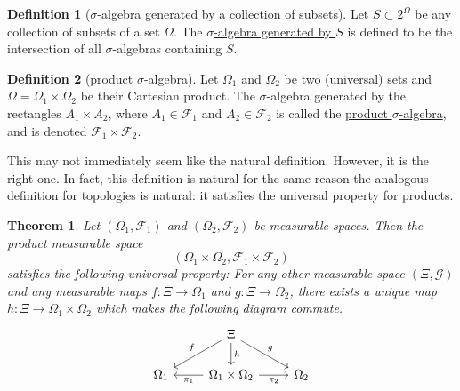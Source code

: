 \documentclass[a4paper,12pt]{scrreprt}
\newcommand{\defn}[1]{\ul{#1}}
\theoremstyle{definition}
\newtheorem{definition}{Definition}[section]
\theoremstyle{plain}
\newtheorem{theorem}{Theorem}[section]
\theoremstyle{remark}
\begin{document}
\begin{definition}[$\sigma$-algebra generated by a collection of subsets]
  \label{def:generatedsigmaalgebra}
  Let $S \subset 2^{\Omega}$ be any collection of subsets of a set $\Omega$. The \defn{$\sigma$-algebra generated by $S$} is defined to be the intersection of all $\sigma$-algebras containing $S$.
\end{definition}

\begin{definition}[product $\sigma$-algebra]
  \label{def:productsigmaalgebra}
  Let $\Omega_{1}$ and $\Omega_{2}$ be two (universal) sets and $\Omega = \Omega_{1} \times \Omega_{2}$ be their Cartesian product. The $\sigma$-algebra generated by the rectangles $A_{1} \times A_{2}$, where $A_{1} \in \mathcal{F}_{1}$ and $A_{2} \in \mathcal{F}_{2}$ is called the \defn{product $\sigma$-algebra}, and is denoted $\mathcal{F}_{1} \times \mathcal{F}_{2}$.
\end{definition}

This may not immediately seem like the natural definition. However, it is the right one. In fact, this definition is natural for the same reason the analogous definition for topologies is natural: it satisfies the universal property for products.

\begin{theorem}
  \label{thm:universalpropertyforproductofmeasurablespaces}
  Let $(\Omega_{1}, \mathcal{F}_{1})$ and $(\Omega_{2}, \mathcal{F}_{2})$ be measurable spaces. Then the product measurable space
  \begin{equation*}
    (\Omega_{1} \times \Omega_{2}, \mathcal{F}_{1} \times \mathcal{F}_{2})
  \end{equation*}
  satisfies the following universal property: For any other measurable space $(\Xi, \mathcal{G})$ and any measurable maps $f\colon \Xi \to \Omega_{1}$ and $g\colon \Xi \to \Omega_{2}$, there exists a unique map $h\colon \Xi \to \Omega_{1} \times \Omega_{2}$ which makes the following diagram commute.
  \begin{equation*}
    \begin{tikzcd}
      & \Xi
      \arrow[dr, "g"]
      \arrow[dl, swap, "f"]
      \arrow[d, "h"]
      \\
      \Omega_{1}
      & \Omega_{1} \times \Omega_{2}
      \arrow[l, "\pi_{1}"]
      \arrow[r, swap, "\pi_{2}"]
      & \Omega_{2}
    \end{tikzcd}
  \end{equation*}
\end{theorem}
\end{document}
